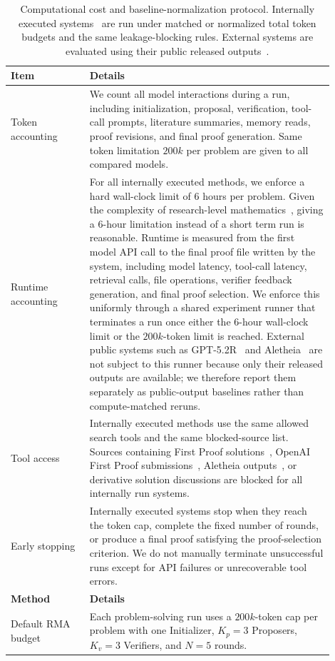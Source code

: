 \documentclass{article}
\begin{document}
\begin{table}[t]
\centering
\caption{Computational cost and baseline-normalization protocol. Internally executed systems~\citep{openai_deep_research_2025,google_gemini_deep_research_2025,zimmer2026agenticresearcherpracticalguide,anthropic_claude_code} are run under matched or normalized total token budgets and the same leakage-blocking rules. External systems are evaluated using their public released outputs~\citep{aletheia,openai_first_proof_2025}.}
\label{tab:compute_costs}
\small
\begin{tabular}{p{0.22\linewidth} p{0.68\linewidth}}
\toprule
\textbf{Item} & \textbf{Details} \\
\midrule

Token accounting
& We count all model interactions during a run, including initialization, proposal, verification, tool-call prompts, literature summaries, memory reads, proof revisions, and final proof generation. Same token limitation $200k$ per problem are given to all compared models. \\

Runtime accounting
& For all internally executed methods, we enforce a hard wall-clock limit of 6 hours per problem. Given the complexity of research-level mathematics~\citep{abouzaid2026first}, giving a 6-hour limitation instead of a short term run is reasonable. Runtime is measured from the first model API call to the final proof file written by the system, including model latency, tool-call latency, retrieval calls, file operations, verifier feedback generation, and final proof selection. We enforce this uniformly through a shared experiment runner that terminates a run once either the 6-hour wall-clock limit or the $200k$-token limit is reached. External public systems such as GPT-5.2R~\citep{openai_first_proof_2025} and Aletheia~\citep{aletheia} are not subject to this runner because only their released outputs are available; we therefore report them separately as public-output baselines rather than compute-matched reruns. \\

Tool access
& Internally executed methods use the same allowed search tools and the same blocked-source list. Sources containing First Proof solutions~\citep{abouzaid2026first}, OpenAI First Proof submissions~\citep{openai_first_proof_2025}, Aletheia outputs~\citep{aletheia}, or derivative solution discussions are blocked for all internally run systems. \\

Early stopping
& Internally executed systems stop when they reach the token cap, complete the fixed number of rounds, or produce a final proof satisfying the proof-selection criterion. We do not manually terminate unsuccessful runs except for API failures or unrecoverable tool errors. \\
\midrule
\textbf{Method} & \textbf{Details} \\
\midrule
Default RMA budget
& Each problem-solving run uses a $200k$-token cap per problem with one Initializer, $K_p=3$ Proposers, $K_v=3$ Verifiers, and $N=5$ rounds. \\



\end{tabular}
\end{table}
\end{document}
